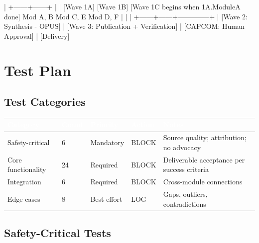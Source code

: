 \documentclass[11pt,letterpaper]{article}
\newcommand{\tableheader}[1]{\textbf{\sffamily\textcolor{white}{#1}}}
\begin{document}
\begin{asciibox}
           |
    +------+------+
    |             |
[Wave 1A]    [Wave 1B]   [Wave 1C begins when 1A.ModuleA done]
 Mod A, B     Mod C, E       Mod D, F
    |             |              |
    +------+------+--------------+
           |
     [Wave 2: Synthesis - OPUS]
           |
     [Wave 3: Publication + Verification]
           |
     [CAPCOM: Human Approval]
           |
     [Delivery]
\end{asciibox}

\section{Test Plan}

\subsection{Test Categories}

\begin{center}
\begin{tabularx}{\textwidth}{L{3cm}C{1.5cm}C{2cm}L{2cm}X}
\toprule
{}
\tableheader{Category} & \tableheader{Count} & \tableheader{Priority} & \tableheader{Action} & \tableheader{Notes} \\
\midrule
Safety-critical & 6 & Mandatory & BLOCK & Source quality; attribution; no advocacy \\
Core functionality & 24 & Required & BLOCK & Deliverable acceptance per success criteria \\
Integration & 6 & Required & BLOCK & Cross-module connections \\
Edge cases & 8 & Best-effort & LOG & Gaps, outliers, contradictions \\
\bottomrule
\end{tabularx}
\end{center}

\subsection{Safety-Critical Tests}
\end{document}
